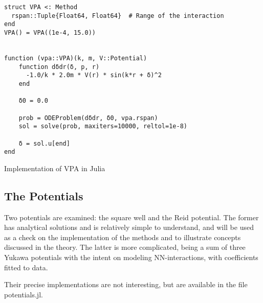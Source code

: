 \begin{listing}
\begin{verbatim}
struct VPA <: Method
  rspan::Tuple{Float64, Float64}  # Range of the interaction
end
VPA() = VPA((1e-4, 15.0))


function (vpa::VPA)(k, m, V::Potential)
    function dδdr(δ, p, r)
      -1.0/k * 2.0m * V(r) * sin(k*r + δ)^2
    end

    δ0 = 0.0

    prob = ODEProblem(dδdr, δ0, vpa.rspan)
    sol = solve(prob, maxiters=10000, reltol=1e-8)

    δ = sol.u[end]
end
  \end{verbatim}
  \caption{Implementation of VPA in Julia}
  \label{lst:vpa}
\end{listing}

\subsection{The Potentials}

Two potentials are examined: the square well and the Reid potential. The former
has analytical solutions and is relatively simple to understand, and will be
used as a check on the implementation of the methods and to illustrate concepts
discussed in the theory. The latter is more complicated, being a sum of three
Yukawa potentials with the intent on modeling NN-interactions, with coefficients
fitted to data. 

Their precise implementations are not interesting, but are available in the file
\textsf{potentials.jl}. 


